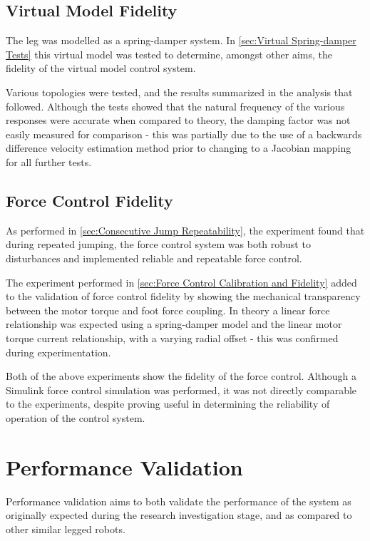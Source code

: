 \subsection{Virtual Model Fidelity}

The leg was modelled as a spring-damper system. In \cref{sec:Virtual Spring-damper Tests} this virtual model was tested to determine, amongst other aims, the fidelity of the virtual model control system. 

Various topologies were tested, and the results summarized in the analysis that followed. Although the tests showed that the natural frequency of the various responses were accurate when compared to theory, the damping factor was not easily measured for comparison - this was partially due to the use of a backwards difference velocity estimation method prior to changing to a Jacobian mapping for all further tests.

\subsection{Force Control Fidelity}

As performed in \cref{sec:Consecutive Jump Repeatability}, the experiment found that during repeated jumping, the force control system was both robust to disturbances and implemented reliable and repeatable force control.

The experiment performed in \cref{sec:Force Control Calibration and Fidelity} added to the validation of force control fidelity by showing the mechanical transparency between the motor torque and foot force coupling. In theory a linear force relationship was expected using a spring-damper model and the linear motor torque current relationship, with a varying radial offset - this was confirmed during experimentation.

Both of the above experiments show the fidelity of the force control. Although a Simulink force control simulation was performed, it was not directly comparable to the experiments, despite proving useful in determining the reliability of operation of the control system.

\section{Performance Validation}

Performance validation aims to both validate the performance of the system as originally expected during the research investigation stage, and as compared to other similar legged robots.


